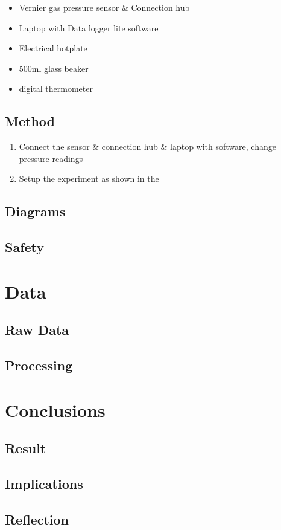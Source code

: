 \documentclass[a4paper,12pt]{article}
\begin{document}
\begin{itemize}
    \item Vernier gas pressure sensor \& Connection hub
    \item Laptop with Data logger lite software
    \item Electrical hotplate
    \item 500ml glass beaker
    \item digital thermometer
\end{itemize}

\subsection{Method}


\begin{enumerate}
    \item Connect the sensor \& connection hub \& laptop with software, change pressure readings
    \item Setup the experiment as shown in the

\end{enumerate}


\subsection{Diagrams}
\subsection{Safety}

\section{Data}
\subsection{Raw Data}
\subsection{Processing}

\section{Conclusions}
\subsection{Result}
\subsection{Implications}
\subsection{Reflection}
\end{document}
